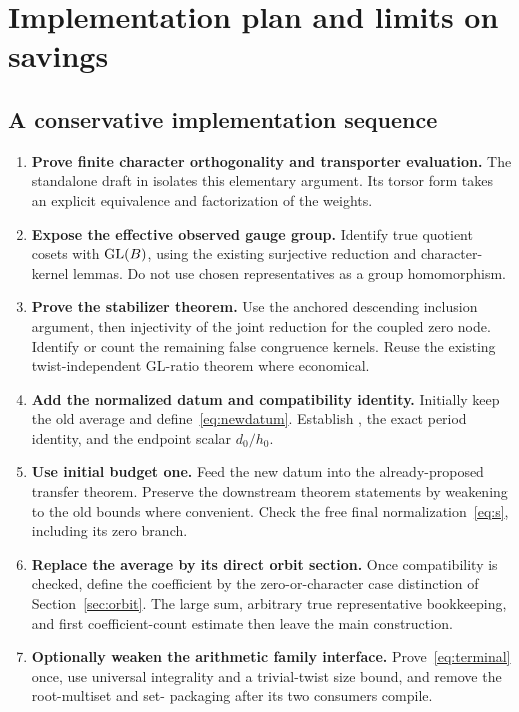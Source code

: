 \section{Implementation plan and limits on savings}
\label{sec:plan}

\subsection{A conservative implementation sequence}

\begin{enumerate}
\item \textbf{Prove finite character orthogonality and transporter evaluation.} The standalone draft in  isolates this elementary argument. Its torsor form takes an explicit equivalence and factorization of the weights.
\item \textbf{Expose the effective observed gauge group.} Identify true quotient cosets with $\operatorname{GL}(B)$, using the existing surjective reduction and character-kernel lemmas. Do not use chosen representatives as a group homomorphism.
\item \textbf{Prove the stabilizer theorem.} Use the anchored descending inclusion argument, then injectivity of the joint reduction for the coupled zero node. Identify or count the remaining false congruence kernels. Reuse the existing twist-independent GL-ratio theorem where economical.
\item \textbf{Add the normalized datum and compatibility identity.} Initially keep the old average and define~\eqref{eq:newdatum}. Establish , the exact period identity, and the endpoint scalar $d_0/h_0$.
\item \textbf{Use initial budget one.} Feed the new datum into the already-proposed transfer theorem. Preserve the downstream theorem statements by weakening to the old bounds where convenient. Check the free final normalization~\eqref{eq:s}, including its zero branch.
\item \textbf{Replace the average by its direct orbit section.} Once compatibility is checked, define the coefficient by the zero-or-character case distinction of Section~\ref{sec:orbit}. The large sum, arbitrary true representative bookkeeping, and first coefficient-count estimate then leave the main construction.
\item \textbf{Optionally weaken the arithmetic family interface.} Prove~\eqref{eq:terminal} once, use universal integrality and a trivial-twist size bound, and remove the root-multiset and set- packaging after its two consumers compile.
\end{enumerate}

